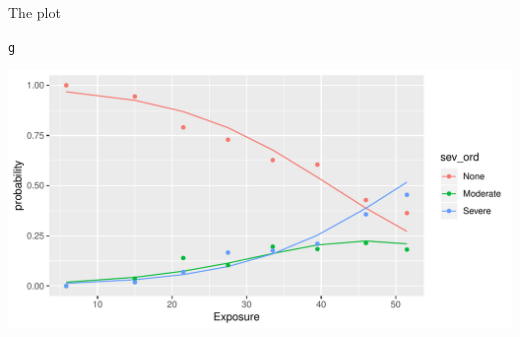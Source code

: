 \documentclass[unknownkeysallowed]{beamer}\usepackage[]{graphicx}\usepackage[]{color}
\makeatletter
\def\maxwidth{ %
  \ifdim\Gin@nat@width>\linewidth
    \linewidth
  \else
    \Gin@nat@width
  \fi
}
\newcommand{\hlstd}[1]{\textcolor[rgb]{0.345,0.345,0.345}{#1}}%
\newenvironment{kframe}{%
 \def\at@end@of@kframe{}%
 \ifinner\ifhmode%
  \def\at@end@of@kframe{\end{minipage}}%
  \begin{minipage}{\columnwidth}%
 \fi\fi%
 \def\FrameCommand##1{\hskip\@totalleftmargin \hskip-\fboxsep
 \colorbox{shadecolor}{##1}\hskip-\fboxsep
     \hskip-\linewidth \hskip-\@totalleftmargin \hskip\columnwidth}%
 \MakeFramed {\advance\hsize-\width
   \@totalleftmargin\z@ \linewidth\hsize
   \@setminipage}}%
 {\par\unskip\endMakeFramed%
 \at@end@of@kframe}
\newenvironment{knitrout}{}{} %
\makeatother
\begin{document}
\begin{frame}[fragile]{The plot}
  
\begin{knitrout}
\color{fgcolor}\begin{kframe}
\begin{alltt}
\hlstd{g}
\end{alltt}
\end{kframe}
\includegraphics[width=\maxwidth]{figure/unnamed-chunk-96-1} 

\end{knitrout}



\end{frame}




\end{document}
